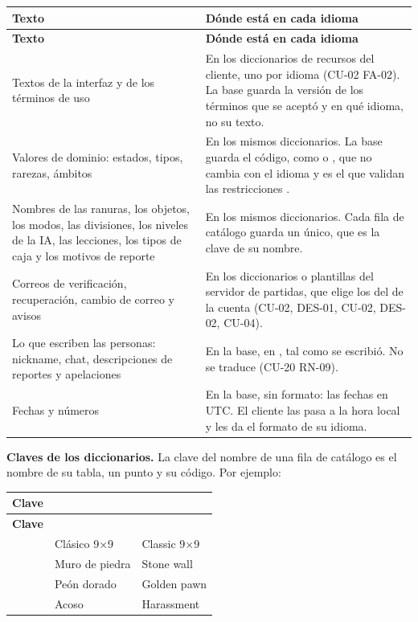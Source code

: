 \begin{center}\small
\begin{longtable}{|L{0.3\textwidth}|L{0.6\textwidth}|}
\hline
\textbf{Texto} & \textbf{Dónde está en cada idioma} \\ \hline
\endfirsthead
\hline
\textbf{Texto} & \textbf{Dónde está en cada idioma} \\ \hline
\endhead
Textos de la interfaz y de los términos de uso & En los diccionarios de recursos del cliente, uno por idioma (\mbox{CU-02} \mbox{FA-02}). La base guarda la versión de los términos que se aceptó y en qué idioma, no su texto. \\ \hline
Valores de dominio: estados, tipos, rarezas, ámbitos & En los mismos diccionarios. La base guarda el código, como  o , que no cambia con el idioma y es el que validan las restricciones . \\ \hline
Nombres de las ranuras, los objetos, los modos, las divisiones, los niveles de la IA, las lecciones, los tipos de caja y los motivos de reporte & En los mismos diccionarios. Cada fila de catálogo guarda un  único, que es la clave de su nombre. \\ \hline
Correos de verificación, recuperación, cambio de correo y avisos & En los diccionarios o plantillas del servidor de partidas, que elige los del  de la cuenta (\mbox{CU-02}, \mbox{DES-01}, \mbox{CU-02}, \mbox{DES-02}, \mbox{CU-04}). \\ \hline
Lo que escriben las personas: nickname, chat, descripciones de reportes y apelaciones & En la base, en , tal como se escribió. No se traduce (\mbox{CU-20} \mbox{RN-09}). \\ \hline
Fechas y números & En la base, sin formato: las fechas en UTC. El cliente las pasa a la hora local y les da el formato de su idioma. \\ \hline
\end{longtable}
\end{center}

\textbf{Claves de los diccionarios.} La clave del nombre de una fila de catálogo es el nombre de su tabla, un punto y su código. Por ejemplo:

\begin{center}\small
\begin{longtable}{|L{0.34\textwidth}|L{0.28\textwidth}|L{0.28\textwidth}|}
\hline
\textbf{Clave} & \textbf{} & \textbf{} \\ \hline
\endfirsthead
\hline
\textbf{Clave} & \textbf{} & \textbf{} \\ \hline
\endhead
{} & Clásico 9×9 & Classic 9×9 \\ \hline
{} & Muro de piedra & Stone wall \\ \hline
{} & Peón dorado & Golden pawn \\ \hline
{} & Acoso & Harassment \\ \hline
\end{longtable}
\end{center}


